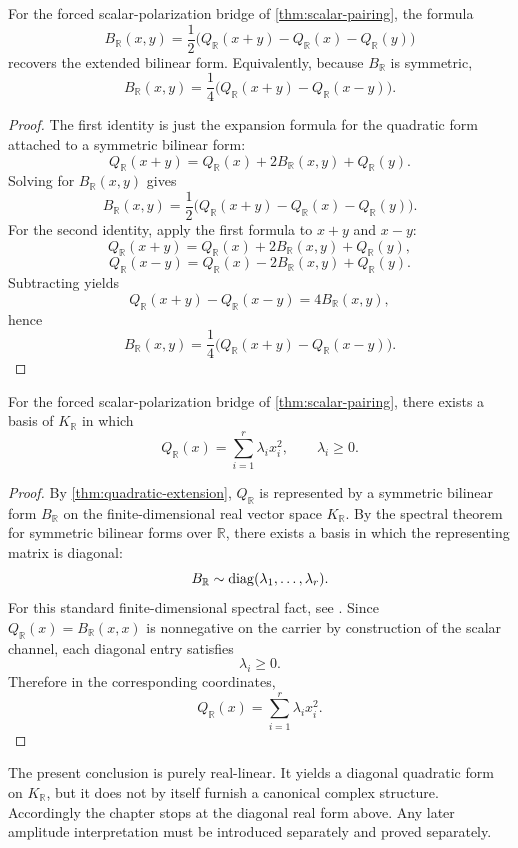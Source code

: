 \begin{corollary}
	For the forced scalar-polarization bridge of \cref{thm:scalar-pairing}, the formula
	\[
		B_{\mathbb R}(x,y)
		=
		\frac12\bigl(Q_{\mathbb R}(x+y)-Q_{\mathbb R}(x)-Q_{\mathbb R}(y)\bigr)
	\]
	recovers the extended bilinear form.  Equivalently, because
	\(B_{\mathbb R}\) is symmetric,
	\[
		B_{\mathbb R}(x,y)
		=
		\frac14\bigl(Q_{\mathbb R}(x+y)-Q_{\mathbb R}(x-y)\bigr).
	\]
\end{corollary}
\begin{proof}
	The first identity is just the expansion formula for the quadratic form
	attached to a symmetric bilinear form:
	\[
		Q_{\mathbb R}(x+y)
		=
		Q_{\mathbb R}(x)+2B_{\mathbb R}(x,y)+Q_{\mathbb R}(y).
	\]
	Solving for \(B_{\mathbb R}(x,y)\) gives
	\[
		B_{\mathbb R}(x,y)
		=
		\frac12\bigl(Q_{\mathbb R}(x+y)-Q_{\mathbb R}(x)-Q_{\mathbb R}(y)\bigr).
	\]
	For the second identity, apply the first formula to \(x+y\) and \(x-y\):
	\[
		Q_{\mathbb R}(x+y)
		=
		Q_{\mathbb R}(x)+2B_{\mathbb R}(x,y)+Q_{\mathbb R}(y),
	\]
	\[
		Q_{\mathbb R}(x-y)
		=
		Q_{\mathbb R}(x)-2B_{\mathbb R}(x,y)+Q_{\mathbb R}(y).
	\]
	Subtracting yields
	\[
		Q_{\mathbb R}(x+y)-Q_{\mathbb R}(x-y)=4B_{\mathbb R}(x,y),
	\]
	hence
	\[
		B_{\mathbb R}(x,y)
		=
		\frac14\bigl(Q_{\mathbb R}(x+y)-Q_{\mathbb R}(x-y)\bigr).
	\]
\end{proof}
\begin{corollary}
	For the forced scalar-polarization bridge of \cref{thm:scalar-pairing}, there exists a basis of
	\(K_{\mathbb R}\) in which
	\[
		Q_{\mathbb R}(x)=\sum_{i=1}^r \lambda_i x_i^2,
		\qquad
		\lambda_i\ge 0.
	\]
\end{corollary}
\begin{proof}
	By \cref{thm:quadratic-extension}, \(Q_{\mathbb R}\) is represented by a
	symmetric bilinear form \(B_{\mathbb R}\) on the finite-dimensional
	real vector space \(K_{\mathbb R}\).  By the spectral theorem for
	symmetric bilinear forms over \(\mathbb R\), there exists a basis in
	which the representing matrix is diagonal:
	\[
		B_{\mathbb R}\sim \operatorname{diag}(\lambda_1,\dots,\lambda_r).
	\]
	For this standard finite-dimensional spectral fact, see
	\cite{Kato1995}.
	Since \(Q_{\mathbb R}(x)=B_{\mathbb R}(x,x)\) is nonnegative on the
	carrier by construction of the scalar channel, each diagonal entry
	satisfies
	\[
		\lambda_i\ge 0.
	\]
	Therefore in the corresponding coordinates,
	\[
		Q_{\mathbb R}(x)=\sum_{i=1}^r \lambda_i x_i^2.
	\]
\end{proof}
\begin{remark}
	The present conclusion is purely real-linear.  It yields a diagonal
	quadratic form on \(K_{\mathbb R}\), but it does not by itself furnish a
	canonical complex structure.  Accordingly the chapter stops at the
	diagonal real form above.  Any later amplitude interpretation must be
	introduced separately and proved separately.
\end{remark}
